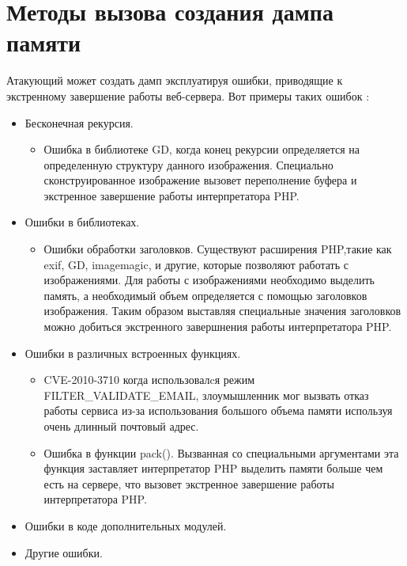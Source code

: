 \documentclass[20pt]{article}
\begin{document}
\newpage

\section{Методы вызова создания дампа памяти}

Атакующий может создать дамп эксплуатируя ошибки, приводящие к экстренному
завершение работы веб-сервера. Вот примеры таких ошибок \cite{php/crash}:
\begin{itemize}
  \item  Бесконечная рекурсия.
    \begin{itemize}
      \item Ошибка в библиотеке GD, когда конец рекурсии определяется на определенную
      структуру данного изображения. Специально сконструированное изображение вызовет
      переполнение буфера и экстренное завершение работы интерпретатора PHP.
    \end{itemize}
  \item Ошибки в библиотеках.
    \begin{itemize}
      \item Ошибки обработки заголовков. Существуют расширения PHP,такие как exif, GD,
        imagemagic, и другие, которые позволяют работать с изображениями. Для работы
        с изображениями необходимо выделить память, а необходимый объем определяется
        с помощью заголовков изображения. Таким образом выставляя специальные значения
        заголовков можно добиться экстренного завершнения работы интерпретатора PHP.
    \end{itemize}
  \item Ошибки в различных встроенных функциях.
    \begin{itemize}
      \item CVE-2010-3710 \cite{cve-2010-3710} когда использовалcя режим
      FILTER\_VALIDATE\_EMAIL, злоумышленник мог вызвать отказ работы сервиса
      из-за использования большого объема памяти используя очень длинный почтовый адрес.
      \item Ошибка в функции pack(). Вызванная со специальными аргументами эта функция
        заставляет интерпретатор PHP выделить памяти больше чем есть на сервере, что
        вызовет экстренное завершение работы интерпретатора PHP.
    \end{itemize}
 \item Ошибки в коде дополнительных модулей.
 \item Другие ошибки.
\end{itemize}
\end{document}
